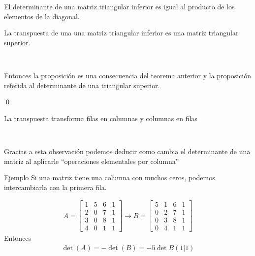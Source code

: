 \documentclass[handout]{beamer} %
\begin{document}
    
    \begin{frame}
    \begin{proposicion}
    
    El determinante de una matriz triangular inferior es igual al producto de los elementos de la diagonal.
     
    \end{proposicion}
    
\begin{demostracion}
    La transpuesta de una una matriz triangular inferior es una matriz triangular superior.
    
    \
    
    Entonces la proposición es una consecuencia del teorema anterior y la proposición referida al determinante de una triangular superior.

    \qed
\end{demostracion}

     
    \end{frame}
    
   
    
    \begin{frame}
    
    
    \begin{observacion}
    La transpuesta transforma filas en columnas y columnas en filas 
    \end{observacion}
    
    \
    
    Gracias a esta observación podemos deducir como cambia el determinante de una matriz al aplicarle ``operaciones elementales por columna''
    \vskip 4cm
    \end{frame}
    
    
    \begin{frame}
    \begin{exampleblock}{Ejemplo}
    Si una matriz tiene una columna con muchos ceros,  podemos intercambiarla con la primera fila.
    \end{exampleblock}
    
    \begin{align*}
    A=\left[
    \begin{array}{cccc}
    1&5&6&1\\
    2&0&7&1\\
    3&0&8&1\\
    4&0&1&1
    \end{array}
    \right]
    \rightarrow
    B=
    \left[
    \begin{array}{cccc}
    5&1&6&1\\
    0&2&7&1\\
    0&3&8&1\\
    0&4&1&1
    \end{array}
    \right]
    \end{align*}
    Entonces
    \begin{align*}
    \det(A)=-\det(B)=-5\det B(1|1)
    \end{align*}
    \end{frame}
    
\end{document}
